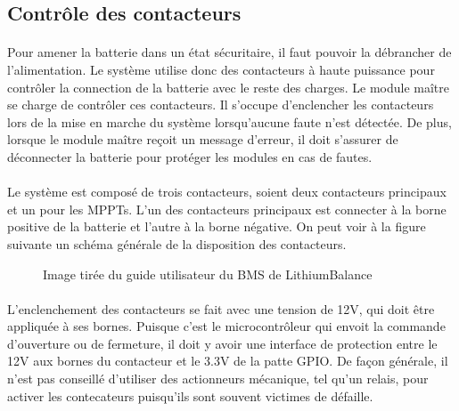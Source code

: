 
\subsection{Contrôle des contacteurs}

	\paragraph*{}
	Pour amener la batterie dans un état sécuritaire, il faut pouvoir la débrancher de l'alimentation. Le système utilise donc des contacteurs à haute puissance pour contrôler la connection de la batterie avec le reste des charges. Le module maître se charge de contrôler ces contacteurs. Il s'occupe d'enclencher les contacteurs lors de la mise en marche du système lorsqu'aucune faute n'est détectée. De plus, lorsque le module maître reçoit un message d'erreur, il doit s'assurer de déconnecter la batterie pour protéger les modules en cas de fautes.

	\paragraph*{}
	Le système est composé de trois contacteurs, soient deux contacteurs principaux et un pour les MPPTs. L'un des contacteurs principaux est connecter à la borne positive de la batterie et l'autre à la borne négative. On peut voir à la figure suivante un schéma générale de la disposition des contacteurs. 
	
	\begin{figure}
		\centering
		\caption[Diagramme général des contacteurs]{Image tirée du guide utilisateur du BMS de LithiumBalance}
		\label{fig:lithiumbalancecontactordiagram}
	\end{figure}

	\paragraph*{}
	L'enclenchement des contacteurs se fait avec une tension de 12V, qui doit être appliquée à ses bornes. Puisque c'est le microcontrôleur qui envoit la commande d'ouverture ou de fermeture, il doit y avoir une interface de protection entre le 12V aux bornes du contacteur et le 3.3V de la patte GPIO. De façon générale, il n'est pas conseillé d'utiliser des actionneurs mécanique, tel qu'un relais, pour activer les contecateurs puisqu'ils sont souvent victimes de défaille. 	 


